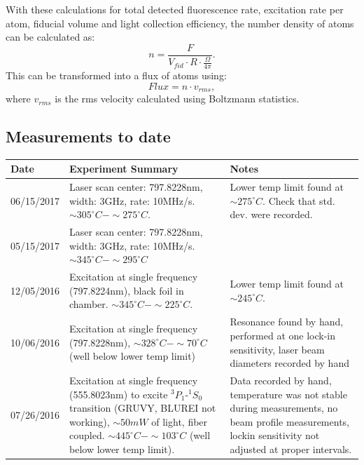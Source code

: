 \documentclass[12pt, a4paper]{article}
\begin{document}
With these calculations for total detected fluorescence rate, excitation rate per atom, fiducial volume and light collection efficiency, the number density of atoms can be calculated as:
\begin{equation}
n = \frac{F}{V_{fid}\cdot R \cdot \frac{\Omega}{4\pi} }.
\end{equation}
This can be transformed into a flux of atoms using:
\begin{equation}
Flux = n\cdot v_{rms},
\end{equation}
where $v_{rms}$ is the rms velocity calculated using Boltzmann statistics.


\subsection{Measurements to date}
\begin{center}
\begin{table}[!h]
\begin{tabular}{||p{2cm}|p{8cm}|p{5cm}||}
\hline
\bf{Date} & \bf{Experiment Summary} & \bf{Notes}\\
\hline
06/15/2017 & Laser scan center: 797.8228nm, width: 3GHz, rate: 10MHz/s. $\sim305^{\circ}C-\sim275^{\circ}C$. &  Lower temp limit found at $\sim275^{\circ}C$. Check that std. dev. were recorded.\\
\hline
05/15/2017 & Laser scan center: 797.8228nm, width: 3GHz, rate: 10MHz/s. $\sim345^{\circ}C-\sim295^{\circ}C$ & \\
\hline 
12/05/2016 & Excitation at single frequency (797.8224nm), black foil in chamber. $\sim345^{\circ}C-\sim225^{\circ}C$. &  Lower temp limit found at $\sim245^{\circ}C$. \\
\hline
10/06/2016 & Excitation at single frequency (797.8228nm), $\sim328^{\circ}C-\sim70^{\circ}C$ (well below lower temp limit) & Resonance found by hand, performed at one lock-in sensitivity, laser beam diameters recorded by hand\\
\hline
07/26/2016 & Excitation at single frequency (555.8023nm) to excite $^{3}P_{1}$-$ ^{1}S_{0}$ transition (GRUVY, BLUREI not working), $\sim50mW$ of light, fiber coupled. $\sim445^{\circ}C-\sim103^{\circ}C$ (well below lower temp limit). & Data recorded by hand, temperature was not stable during measurements, no beam profile measurements, lockin sensitivity not adjusted at proper intervals.\\
\hline
\end{tabular}
\end{table}
\end{center}
\end{document}
